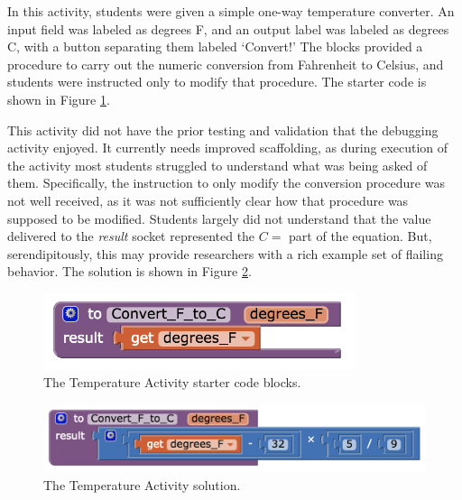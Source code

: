 In this activity, students were given a simple one-way temperature converter. An input field was labeled as degrees F, and an output label was labeled as degrees C, with a button separating them labeled `Convert!' The blocks provided a procedure to carry out the numeric conversion from Fahrenheit to Celsius, and students were instructed only to modify that procedure. The starter code is shown in Figure \ref{fig:temperature0}.

This activity did not have the prior testing and validation that the debugging activity enjoyed. It currently needs improved scaffolding, as during execution of the activity most students struggled to understand what was being asked of them. Specifically, the instruction to only modify the conversion procedure was not well received, as it was not sufficiently clear how that procedure was supposed to be modified. Students largely did not understand that the value delivered to the \emph{result} socket represented the $C=$ part of the equation. But, serendipitously, this may provide researchers with a rich example set of flailing behavior. The solution is shown in Figure \ref{fig:temperature1}.

\begin{figure}
  \centering
      \includegraphics[width=3.6in]{images/temperatureActivity/temperature0start}
  \caption[The Temperature Activity starter code blocks]{The Temperature Activity starter code blocks.}
  \label{fig:temperature0}
\end{figure}

\begin{figure}
  \centering
      \includegraphics[width=\textwidth]{images/temperatureActivity/temperature1solution}
  \caption[The Temperature Activity solution]{The Temperature Activity solution.}
  \label{fig:temperature1}
\end{figure}


